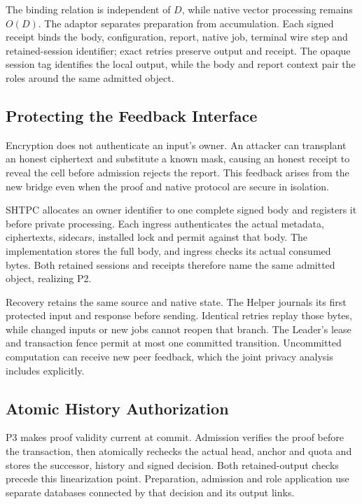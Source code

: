 \documentclass[conference,compsoc]{IEEEtran}
\theoremstyle{definition}
\numberwithin{equation}{section}
\numberwithin{table}{section}
\numberwithin{figure}{section}
\theoremstyle{plain}
\begin{document}
The binding relation is independent of \(D\), while native vector processing
remains \(O(D)\). The adaptor separates preparation from accumulation. Each signed
receipt binds the body, configuration, report, native job, terminal wire step
and retained-session identifier; exact retries preserve output and receipt.
The opaque session tag identifies the local output, while the body and report
context pair the roles around the same admitted object.

\subsection{Protecting the Feedback Interface}
\label{sec:origin-feedback}
\label{sec:cross-role}

Encryption does not authenticate an input's owner. An attacker can transplant
an honest ciphertext and substitute a known mask, causing an honest receipt to
reveal the cell before admission rejects the report. This feedback arises from
the new bridge even when the proof and native protocol are secure in isolation.

SHTPC allocates an owner identifier to one complete signed body and registers
it before private processing. Each ingress authenticates the actual metadata, ciphertexts, sidecars,
installed lock and permit against that body. The implementation stores the full body, and ingress checks its actual
consumed bytes. Both retained sessions and receipts therefore name the same
admitted object, realizing P2.

Recovery retains the same source and native state. The Helper journals its
first protected input and response before sending. Identical retries replay
those bytes, while changed inputs or new jobs cannot reopen that branch. The
Leader's lease and transaction fence permit at most one committed transition.
Uncommitted computation can receive new peer feedback, which the joint privacy
analysis includes explicitly.

\subsection{Atomic History Authorization}
\label{sec:admission}

P3 makes proof validity current at commit. Admission verifies the proof before
the transaction, then atomically rechecks the actual head, anchor and quota and
stores the successor, history and signed decision. Both retained-output checks
precede this linearization point. Preparation, admission and role application
use separate databases connected by that decision and its output links.
\end{document}
